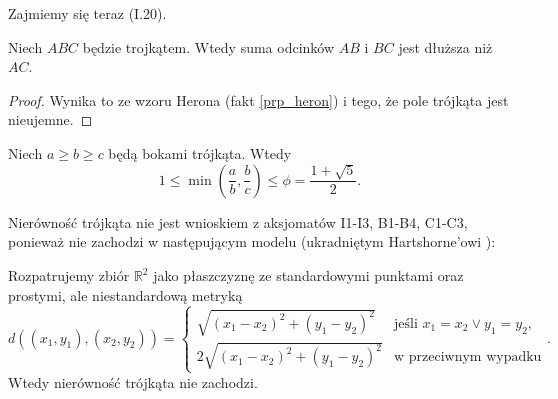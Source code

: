 %

Zajmiemy się teraz (I.20).

\begin{proposition}
%
	Niech $ABC$ będzie trojkątem.
	Wtedy suma odcinków $AB$ i $BC$ jest dłuższa niż $AC$.
\end{proposition}

\begin{proof}
	Wynika to ze wzoru Herona (fakt \ref{prp_heron}) i tego, że pole trójkąta jest nieujemne.
\end{proof}

\begin{corollary}
	Niech $a \ge b \ge c$ będą bokami trójkąta.
	Wtedy
	\begin{equation}
		1 \le \min \left(\frac ab, \frac bc\right) \le \phi = \frac {1 + \sqrt 5}{2}.
	\end{equation}
\end{corollary}

Nierówność trójkąta nie jest wnioskiem z aksjomatów I1-I3, B1-B4, C1-C3, ponieważ nie zachodzi w następującym modelu (ukradniętym Hartshorne'owi \cite[s. 90]{hartshorne2000}):

\begin{example}
	Rozpatrujemy zbiór $\mathbb R^2$ jako płaszczyznę ze standardowymi punktami oraz prostymi, ale niestandardową metryką
	\begin{equation}
		d((x_1, y_1), (x_2, y_2)) = \begin{cases}
			\sqrt{(x_1-x_2)^2 + (y_1-y_2)^2} & \text{jeśli } x_1 = x_2 \vee y_1 = y_2, \\
			2 \sqrt{(x_1-x_2)^2 + (y_1-y_2)^2} & \text{w przeciwnym wypadku}
		\end{cases}.
	\end{equation}
	Wtedy nierówność trójkąta nie zachodzi.
\end{example}

%